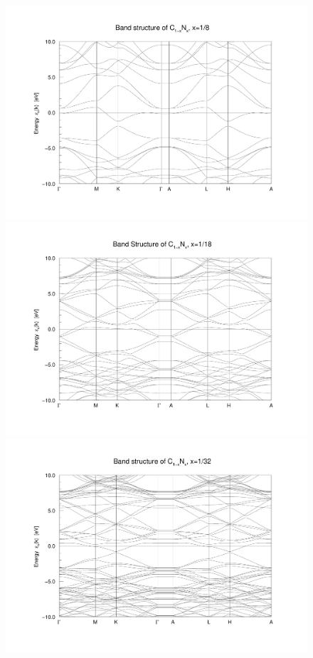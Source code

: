 \begin{figure}
\begin{minipage}[t]{0.3\textwidth}
						\includegraphics[width=\textwidth]{Results/Nitrogen/Nitrogen2/nitrogen2band.pdf}
					\end{minipage}
					\begin{minipage}[t]{0.3\textwidth}
						\includegraphics[width=\textwidth]{Results/Nitrogen/Nitrogen3/nitrogen3band.pdf}
					\end{minipage}
					\begin{minipage}[t]{0.3\textwidth}
						\includegraphics[width=\textwidth]{Results/Nitrogen/Nitrogen4/nitrogen4band.pdf}

\end{minipage}
\end{figure}
